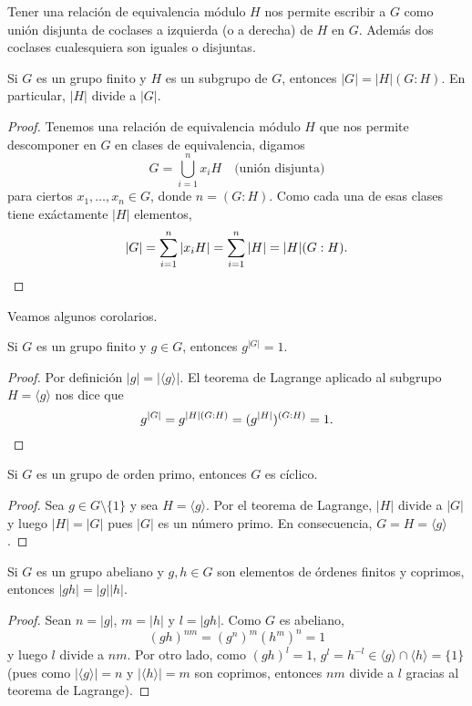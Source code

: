 Tener una relación de equivalencia módulo $H$ nos permite escribir a $G$ como
unión disjunta de coclases a izquierda (o a derecha) de $H$ en $G$. Además dos
coclases cualesquiera son iguales o disjuntas. 

\begin{theorem}[Lagrange]
	Si $G$ es un grupo finito y $H$ es un subgrupo de $G$, entonces
	$|G|=|H|(G:H)$. En particular, $|H|$ divide a $|G|$. 
\end{theorem}

\begin{proof}
	Tenemos una relación de equivalencia módulo $H$ que nos permite descomponer
	en $G$ en clases de equivalencia, digamos
	\[
	G=\bigcup_{i=1}^n x_iH\quad\text{(unión disjunta)}
	\]
	para ciertos $x_1,\dots,x_n\in G$, donde $n=(G:H)$. Como cada una de esas clases tiene exáctamente
	$|H|$ elementos,  
	\[
		|G|=\sum_{i=1}^n|x_iH|=\sum_{i=1}^n|H|=|H|(G:H).\qedhere
	\]
\end{proof}

Veamos algunos corolarios. 

\begin{corollary}
	Si $G$ es un grupo finito y $g\in G$, entonces $g^{|G|}=1$. 	
\end{corollary}

\begin{proof}
	Por definición $|g|=|\langle g\rangle|$. El teorema de Lagrange aplicado al
	subgrupo $H=\langle g\rangle$ nos dice que 
	\[
		g^{|G|}=g^{|H|(G:H)}=(g^{|H|})^{(G:H)}=1.\qedhere
	\]
\end{proof}

\begin{corollary}
	Si $G$ es un grupo de orden primo, entonces $G$ es cíclico.
\end{corollary}

\begin{proof}
	Sea $g\in G\setminus\{1\}$ y sea $H=\langle g\rangle$. Por el teorema de
	Lagrange, $|H|$ divide a $|G|$ y luego $|H|=|G|$ pues $|G|$ es un número
	primo. En consecuencia, $G=H=\langle g\rangle$. 
\end{proof}

\begin{corollary}
\label{cor:ordenes_coprimos}
	Si $G$ es un grupo abeliano y $g,h\in G$ son elementos de órdenes finitos y coprimos, entonces
	$|gh|=|g||h|$.
\end{corollary}

\begin{proof}
Sean $n=|g|$, $m=|h|$ y $l=|gh|$. Como $G$ es abeliano, 
\[
(gh)^{nm}=(g^n)^m(h^m)^n=1
\]
y luego $l$ divide a $nm$. Por otro lado, como $(gh)^l=1$, 
$g^l=h^{-l}\in \langle g\rangle\cap\langle h\rangle=\{1\}$ (pues como $|\langle g\rangle|=n$ y $|\langle h\rangle|=m$ son coprimos, 
entonces $nm$ divide a $l$ gracias al teorema de Lagrange). 
\end{proof}

